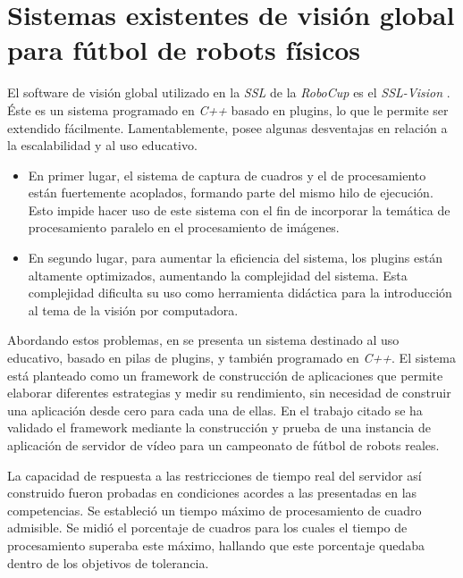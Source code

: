 
\section{Sistemas existentes de visión global para fútbol de robots físicos}

\label{svgExistentes}

El software de visión global utilizado en la \emph{SSL} de la \emph{RoboCup} es
el \emph{SSL-Vision} \cite{sslvision}. Éste es un sistema programado en
\emph{C++} basado en plugins, lo que le permite ser extendido fácilmente.
Lamentablemente, posee algunas desventajas en relación a la escalabilidad y al
uso educativo.

\begin{itemize}

	\item 	En primer lugar, el sistema de captura de cuadros y el de
		procesamiento están fuertemente acoplados, formando parte del
		mismo hilo de ejecución. Esto impide hacer uso de este sistema
		con el fin de incorporar la temática de procesamiento paralelo
		en el procesamiento de imágenes.

	\item 	En segundo lugar, para aumentar la eficiencia del sistema, los
		plugins están altamente optimizados, aumentando la complejidad
		del sistema. Esta complejidad dificulta su uso como herramienta
		didáctica para la introducción al tema de la visión por
		computadora.

\end{itemize}

Abordando estos problemas, en \cite{torres2014} se presenta un sistema destinado
al uso educativo, basado en pilas de plugins, y también programado en
\emph{C++}. El sistema está planteado como un framework de construcción de
aplicaciones que permite elaborar diferentes estrategias y medir su rendimiento,
sin necesidad de construir una aplicación desde cero para cada una de ellas. En
el trabajo citado se ha validado el framework mediante la construcción y prueba
de una instancia de aplicación de servidor de vídeo para un campeonato de fútbol
de robots reales.

La capacidad de respuesta a las restricciones de tiempo real del servidor así
construido fueron probadas en condiciones acordes a las presentadas en las
competencias. Se estableció un tiempo máximo de procesamiento de cuadro
admisible. Se midió el porcentaje de cuadros para los cuales el tiempo de
procesamiento superaba este máximo, hallando que este porcentaje quedaba dentro
de los objetivos de tolerancia.


